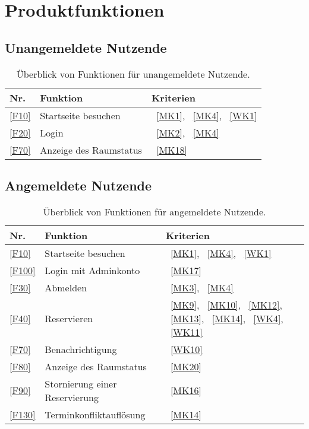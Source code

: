 

\chapter{Produktfunktionen}
\label{chap:product_functions}


\section{Unangemeldete Nutzende}\label{sec:unangemeldete-benutzer-funktionen}

\begin{table}[htbp]
    \centering
    \begin{tabularx}{\textwidth}{ l|X|>{\raggedright\arraybackslash}X }
        \textbf{Nr.} & \textbf{Funktion} & \textbf{Kriterien} \\ \hline\hline
        \ref{F10} & Startseite besuchen &~\ref{MK1}, ~\ref{MK4}, ~\ref{WK1} \\
        \ref{F20} & Login &~\ref{MK2}, ~\ref{MK4} \\
        \ref{F70} & Anzeige des Raumstatus &~\ref{MK18} \\
    \end{tabularx}
    \caption{Überblick von Funktionen für unangemeldete Nutzende.}
    \label{tab:non_loggedin_functions}
\end{table}


\section{Angemeldete Nutzende}\label{sec:angemeldete-benutzer-funktionen}
\begin{table}[htbp]
    \centering
    \begin{tabularx}{\textwidth}{ l|X|>{\raggedright\arraybackslash}X }
        \textbf{Nr.} & \textbf{Funktion} & \textbf{Kriterien} \\ \hline\hline
        \ref{F10} & Startseite besuchen &~\ref{MK1}, ~\ref{MK4}, ~\ref{WK1} \\
        \ref{F100} & Login mit Adminkonto &~\ref{MK17} \\
        \ref{F30} & Abmelden &~\ref{MK3}, ~\ref{MK4} \\
        \ref{F40} & Reservieren &~\ref{MK9}, ~\ref{MK10}, ~\ref{MK12}, ~\ref{MK13}, ~\ref{MK14}, ~\ref{WK4}, ~\ref{WK11} \\
        \ref{F70} & Benachrichtigung &~\ref{WK10} \\
        \ref{F80} & Anzeige des Raumstatus &~\ref{MK20} \\
        \ref{F90} & Stornierung einer Reservierung &~\ref{MK16} \\
        \ref{F130} & Terminkonfliktauflösung &~\ref{MK14} \\
    \end{tabularx}
    \caption{Überblick von Funktionen für angemeldete Nutzende.}
    \label{tab:loggedin_functions}
\end{table}
\newpage
